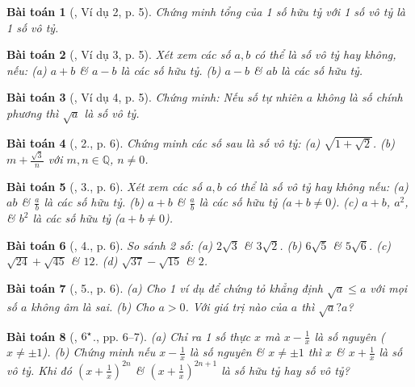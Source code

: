 \documentclass{article}
\newtheorem{baitoan}{Bài toán}
\begin{document}
\begin{baitoan}[\cite{Binh_Toan_9_tap_1}, Ví dụ 2, p. 5]
	Chứng minh tổng của 1 số hữu tỷ với 1 số vô tỷ là 1 số vô tỷ.
\end{baitoan}

\begin{baitoan}[\cite{Binh_Toan_9_tap_1}, Ví dụ 3, p. 5]
	Xét xem các số $a,b$ có thể là số vô tỷ hay không, nếu: (a) $a + b$ \& $a - b$ là các số hữu tỷ. (b) $a - b$ \& $ab$ là các số hữu tỷ.
\end{baitoan}

\begin{baitoan}[\cite{Binh_Toan_9_tap_1}, Ví dụ 4, p. 5]
	Chứng minh: Nếu số tự nhiên $a$ không là số chính phương thì $\sqrt{a}$ là số vô tỷ.
\end{baitoan}

\begin{baitoan}[\cite{Binh_Toan_9_tap_1}, 2., p. 6]
	Chứng minh các số sau là số vô tỷ: (a) $\sqrt{1 + \sqrt{2}}$. (b) $m + \frac{\sqrt{3}}{n}$ với $m,n\in\mathbb{Q}$, $n\ne0$.
\end{baitoan}

\begin{baitoan}[\cite{Binh_Toan_9_tap_1}, 3., p. 6]
	Xét xem các số $a,b$ có thể là số vô tỷ hay không nếu: (a) $ab$ \& $\frac{a}{b}$ là các số hữu tỷ. (b) $a + b$ \& $\frac{a}{b}$ là các số hữu tỷ ($a + b\ne0$). (c) $a + b$, $a^2$, \& $b^2$ là các số hữu tỷ ($a + b\ne0$).
\end{baitoan}

\begin{baitoan}[\cite{Binh_Toan_9_tap_1}, 4., p. 6]
	So sánh 2 số: (a) $2\sqrt{3}$ \& $3\sqrt{2}$. (b) $6\sqrt{5}$ \& $5\sqrt{6}$. (c) $\sqrt{24} + \sqrt{45}$ \& $12$. (d) $\sqrt{37} - \sqrt{15}$ \& $2$.
\end{baitoan}

\begin{baitoan}[\cite{Binh_Toan_9_tap_1}, 5., p. 6]
	(a) Cho 1 ví dụ để chứng tỏ khẳng định $\sqrt{a}\le a$ với mọi số $a$ không âm là sai. (b) Cho $a > 0$. Với giá trị nào của $a$ thì $\sqrt{a} ? a$?
\end{baitoan}

\begin{baitoan}[\cite{Binh_Toan_9_tap_1}, $\rm6^\star$., pp. 6--7]
	(a) Chỉ ra 1 số thực $x$ mà $x - \frac{1}{x}$ là số nguyên ($x\ne\pm1$). (b) Chứng minh nếu $x - \frac{1}{x}$ là số nguyên \& $x\ne\pm1$ thì $x$ \& $x + \frac{1}{x}$ là số vô tỷ. Khi đó $\left(x + \frac{1}{x}\right)^{2n}$ \& $\left(x + \frac{1}{x}\right)^{2n+1}$ là số hữu tỷ hay số vô tỷ?
\end{baitoan}
\end{document}

